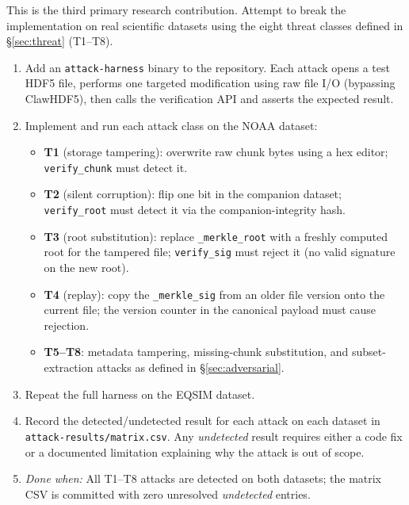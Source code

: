 \documentclass[11pt]{article}
\begin{document}
This is the third primary research contribution. Attempt to break the
implementation on real scientific datasets using the eight threat classes
defined in \S\ref{sec:threat} (T1--T8).

\begin{enumerate}[nosep]
  \item Add an \texttt{attack-harness} binary to the repository. Each attack
    opens a test HDF5 file, performs one targeted modification using raw
    file I/O (bypassing ClawHDF5), then calls the verification API and
    asserts the expected result.
  \item Implement and run each attack class on the NOAA dataset:
    \begin{itemize}[nosep]
      \item \textbf{T1} (storage tampering): overwrite raw chunk bytes using
        a hex editor; \texttt{verify\_chunk} must detect it.
      \item \textbf{T2} (silent corruption): flip one bit in the companion
        dataset; \texttt{verify\_root} must detect it via the
        companion-integrity hash.
      \item \textbf{T3} (root substitution): replace \texttt{\_merkle\_root}
        with a freshly computed root for the tampered file;
        \texttt{verify\_sig} must reject it (no valid signature on the
        new root).
      \item \textbf{T4} (replay): copy the \texttt{\_merkle\_sig} from an
        older file version onto the current file; the version counter in
        the canonical payload must cause rejection.
      \item \textbf{T5--T8}: metadata tampering, missing-chunk substitution,
        and subset-extraction attacks as defined in \S\ref{sec:adversarial}.
    \end{itemize}
  \item Repeat the full harness on the EQSIM dataset.
  \item Record the detected/undetected result for each attack on each
    dataset in \texttt{attack-results/matrix.csv}. Any \emph{undetected}
    result requires either a code fix or a documented limitation explaining
    why the attack is out of scope.
  \item \emph{Done when:} All T1--T8 attacks are detected on both datasets;
    the matrix CSV is committed with zero unresolved \emph{undetected} entries.
\end{enumerate}

\end{document}
